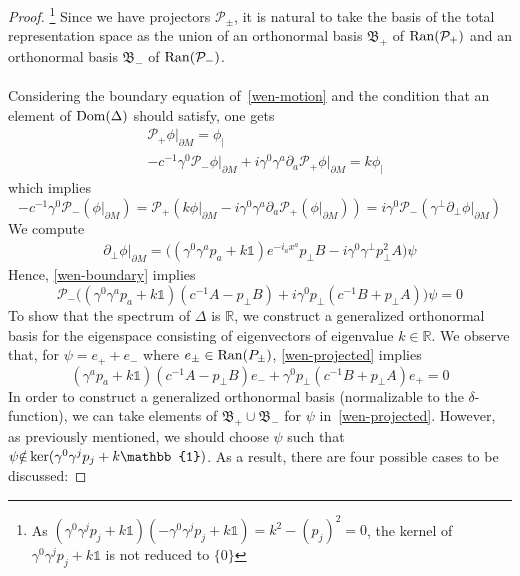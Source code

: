 \begin{proof}
\footnote{
As 
$(\gamma^0\gamma^j p_j + k \mathbb{1})
(-\gamma^0\gamma^j p_j + k \mathbb{1})  
= k^2 - (p_j)^2= 0$, 
the kernel of $\gamma^0 \gamma^j p_j + k \mathbb{1}$ is not reduced to $\{ 0 \}$
} 
Since we have projectors $\mathcal{P}_\pm$, 
it is natural to take the basis of the total representation space as the union of an orthonormal basis $\mathfrak{B}_+$ of $\mathrm{Ran}(\mathcal{P}_+)$ and an orthonormal basis $\mathfrak{B}_-$ of $\mathrm{Ran}(\mathcal{P}_-)$. \\\\
Considering the boundary equation of~\cref{wen-motion} and the condition that an element of $\mathrm{Dom}(\Delta)$ should satisfy, one gets
\begin{equation}\label{wen-boundary}
\begin{split}
& \mathcal{P}_+\phi\vert_{\partial M} =  \phi_| \\
& -c^{-1} \gamma^0 \mathcal{P}_- \phi\vert_{\partial M} + i\gamma^0\gamma^a\partial_a \mathcal{P}_+\phi\vert_{\partial M} = k \phi_| 
\end{split}
\end{equation}
which implies
\begin{equation}\label{wen-boundary2}
-c^{-1} \gamma^0 \mathcal{P}_-(\phi\vert_{\partial M}) = 
\mathcal{P}_+(k\phi\vert_{\partial M} - i\gamma^0\gamma^a\partial_a\mathcal{P}_+(\phi\vert_{\partial M})) = 
i\gamma^0\mathcal{P}_-(\gamma^\bot\partial_\bot \phi\vert_{\partial M})
\end{equation}
We compute
\begin{equation*}
\begin{split}
\partial_\bot \phi \vert_{\partial M} = 
\big((\gamma^0\gamma^a p_a + k\mathbb{1})e^{-i_a x^a} p_\bot B - i\gamma^0\gamma^\bot p_\bot^2 A \big) \psi
\end{split}
\end{equation*}
Hence, \cref{wen-boundary} implies
\begin{equation}\label{wen-projected}
\mathcal{P}_- \Big( (\gamma^0 \gamma^a p_a + k\mathbb{1})(c^{-1} A - p_\bot B)
+i \gamma^0 p_\bot(c^{-1} B + p_\bot A) \Big) \psi = 0
\end{equation}
To show that the spectrum of $\Delta$ is $\mathbb{R}$, 
we construct a generalized orthonormal basis for the eigenspace consisting of eigenvectors of eigenvalue $k{\in}\mathbb{R}$.
We observe that, 
for $\psi = e_+ + e_-$ where $e_\pm \in \mathrm{Ran}({P}_\pm)$,
\cref{wen-projected} implies
\begin{equation}\label{wen-projected2}
(\gamma^a p_a + k\mathbb{1})(c^{-1}A - p_\bot B) e_- +\gamma^0 p_\bot(c^{-1}B + p_\bot A) e_+ = 0
\end{equation}
In order to construct a generalized orthonormal basis (normalizable to the $\delta$-function),
we can take elements of $\mathfrak{B}_+ \cup \mathfrak{B}_-$ for $\psi$ in~\cref{wen-projected}.
However, as previously mentioned, we should choose $\psi$ such that $\psi\slashed{\in}\ker(\gamma^0\gamma^j p_j + k\mathbb{1})$.
As a result, there are four possible cases to be discussed: 

\end{proof}
